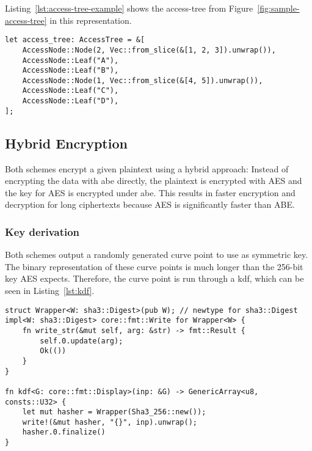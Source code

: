 Listing~\ref{lst:access-tree-example} shows the \gls{access-tree} from Figure~\ref{fig:sample-access-tree} in this representation.

\begin{lstlisting}[caption={Sample access tree in the heapless Rust representation},label={lst:access-tree-example}]
let access_tree: AccessTree = &[
    AccessNode::Node(2, Vec::from_slice(&[1, 2, 3]).unwrap()),
    AccessNode::Leaf("A"),
    AccessNode::Leaf("B"),
    AccessNode::Node(1, Vec::from_slice(&[4, 5]).unwrap()),
    AccessNode::Leaf("C"),
    AccessNode::Leaf("D"),
];
\end{lstlisting}

\subsection{Hybrid Encryption}
Both schemes encrypt a given plaintext using a hybrid approach:
Instead of encrypting the data with \acrshort{abe} directly, the plaintext is encrypted with AES and the key for AES is encrypted under \acrshort{abe}.
This results in faster encryption and decryption for long ciphertexts because AES is significantly faster than ABE.


\subsubsection{Key derivation}\label{sec:kdf}
Both schemes output a randomly generated curve point to use as symmetric key.
The binary representation of these curve points is much longer than the 256-bit key AES expects.
Therefore, the curve point is run through a \gls{kdf}, which can be seen in Listing~\ref{lst:kdf}.

\begin{lstlisting}[caption={Hash-based key derivation Function for curve points},label={lst:kdf}]
struct Wrapper<W: sha3::Digest>(pub W); // newtype for sha3::Digest
impl<W: sha3::Digest> core::fmt::Write for Wrapper<W> {
    fn write_str(&mut self, arg: &str) -> fmt::Result {
        self.0.update(arg);
        Ok(())
    }
}

fn kdf<G: core::fmt::Display>(inp: &G) -> GenericArray<u8, consts::U32> {
    let mut hasher = Wrapper(Sha3_256::new());
    write!(&mut hasher, "{}", inp).unwrap();
    hasher.0.finalize()
}
\end{lstlisting}

